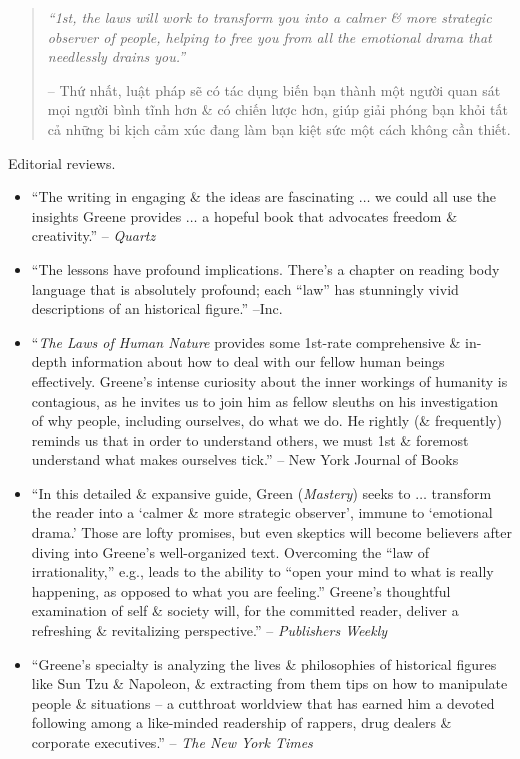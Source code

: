 \documentclass{article}
\begin{document}
\begin{enumerate}
\begin{quotation}
		{\it``1st, the laws will work to transform you into a calmer \& more strategic observer of people, helping to free you from all the emotional drama that needlessly drains you.''}
		
		-- Thứ nhất, luật pháp sẽ có tác dụng biến bạn thành một người quan sát mọi người bình tĩnh hơn \& có chiến lược hơn, giúp giải phóng bạn khỏi tất cả những bi kịch cảm xúc đang làm bạn kiệt sức một cách không cần thiết.
	\end{quotation}
	{\sf Editorial reviews.}
	\begin{itemize}
		\item ``The writing in engaging \& the ideas are fascinating $\ldots$ we could all use the insights {\sc Greene} provides $\ldots$ a hopeful book that advocates freedom \& creativity.'' -- {\it Quartz}
		\item ``The lessons have profound implications. There's a chapter on reading body language that is absolutely profound; each ``law'' has stunningly vivid descriptions of an historical figure.'' --Inc.
		\item ``{\it The Laws of Human Nature} provides some 1st-rate comprehensive \& in-depth information about how to deal with our fellow human beings effectively. {\sc Greene}'s intense curiosity about the inner workings of humanity is contagious, as he invites us to join him as fellow sleuths on his investigation of why people, including ourselves, do what we do. He rightly (\& frequently) reminds us that in order to understand others, we must 1st \& foremost understand what makes ourselves tick.'' -- New York Journal of Books
		\item ``In this detailed \& expansive guide, {\sc Green} ({\it Mastery}) seeks to $\ldots$ transform the reader into a `calmer \& more strategic observer', immune to `emotional drama.' Those are lofty promises, but even skeptics will become believers after diving into {\sc Greene}'s well-organized text. Overcoming the ``law of irrationality,'' e.g., leads to the ability to ``open your mind to what is really happening, as opposed to what you are feeling.'' {\sc Greene}'s thoughtful examination of self \& society will, for the committed reader, deliver a refreshing \& revitalizing perspective.'' -- {\it Publishers Weekly}
		\item ``{\sc Greene}'s specialty is analyzing the lives \& philosophies of historical figures like {\sc Sun Tzu} \& {\sc Napoleon}, \& extracting from them tips on how to manipulate people \& situations -- a cutthroat worldview that has earned him a devoted following among a like-minded readership of rappers, drug dealers \& corporate executives.'' -- {\it The New York Times}

\end{itemize}
\end{enumerate}
\end{document}
